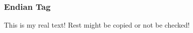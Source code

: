 \subsubsection{Endian Tag} \label{subsubsection:evaluation-reengineering-break-endian}
This is my real text! Rest might be copied or not be checked!
